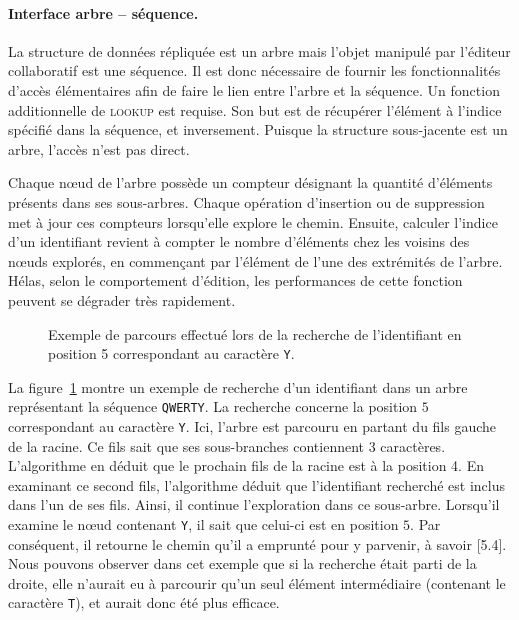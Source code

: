 \paragraph{Interface arbre -- séquence.} La structure de données répliquée est
un arbre mais l'objet manipulé par l'éditeur collaboratif est une séquence. Il
est donc nécessaire de fournir les fonctionnalités d'accès élémentaires afin de
faire le lien entre l'arbre et la séquence. Un fonction additionnelle de
\textsc{lookup} est requise. Son but est de récupérer l'élément à l'indice
spécifié dans la séquence, et inversement. Puisque la structure sous-jacente est
un arbre, l'accès n'est pas direct.

\noindent Chaque nœud de l'arbre possède un compteur désignant la quantité
d'éléments présents dans ses sous-arbres. Chaque opération d'insertion ou de
suppression met à jour ces compteurs lorsqu'elle explore le chemin. Ensuite,
calculer l'indice d'un identifiant revient à compter le nombre d'éléments chez
les voisins des nœuds explorés, en commençant par l'élément de l'une des
extrémités de l'arbre. Hélas, selon le comportement d'édition, les performances
de cette fonction peuvent se dégrader très rapidement.

\begin{figure}
  \centering
  
  \caption[Recherche d'identifiants dans l'arbre] {\label{repl:fig:getexample}
    Exemple de parcours effectué lors de la recherche de l'identifiant en
    position 5 correspondant au caractère \texttt{Y}.}
\end{figure}

\noindent La figure~\ref{repl:fig:getexample} montre un exemple de recherche
d'un identifiant dans un arbre représentant la séquence \texttt{QWERTY}. La
recherche concerne la position $5$ correspondant au caractère \texttt{Y}. Ici,
l'arbre est parcouru en partant du fils gauche de la racine. Ce fils sait que
ses sous-branches contiennent 3 caractères. L'algorithme en déduit que le
prochain fils de la racine est à la position 4. En examinant ce second fils,
l'algorithme déduit que l'identifiant recherché est inclus dans l'un de ses
fils. Ainsi, il continue l'exploration dans ce sous-arbre. Lorsqu'il examine le
nœud contenant \texttt{Y}, il sait que celui-ci est en position $5$. Par
conséquent, il retourne le chemin qu'il a emprunté pour y parvenir, à savoir
[5.4]. Nous pouvons observer dans cet exemple que si la recherche était parti de
la droite, elle n'aurait eu à parcourir qu'un seul élément intermédiaire
(contenant le caractère \texttt{T}), et aurait donc été plus efficace.

